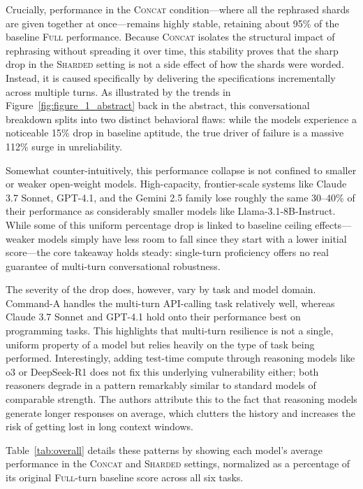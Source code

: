 \documentclass[manuscript,review]{acmart}
\begin{document}
Crucially, performance in the \textsc{Concat} condition—where all the rephrased shards are given together at once—remains highly stable, retaining about 95\% of the baseline \textsc{Full} performance. Because \textsc{Concat} isolates the structural impact of rephrasing without spreading it over time, this stability proves that the sharp drop in the \textsc{Sharded} setting is not a side effect of how the shards were worded. Instead, it is caused specifically by delivering the specifications incrementally across multiple turns. As illustrated by the trends in Figure~\ref{fig:figure_1_abstract} back in the abstract, this conversational breakdown splits into two distinct behavioral flaws: while the models experience a noticeable 15\% drop in baseline aptitude, the true driver of failure is a massive 112\% surge in unreliability.
 
Somewhat counter-intuitively, this performance collapse is not confined to smaller or weaker open-weight models. High-capacity, frontier-scale systems like Claude 3.7 Sonnet, GPT-4.1, and the Gemini 2.5 family lose roughly the same 30--40\% of their performance as considerably smaller models like Llama-3.1-8B-Instruct. While some of this uniform percentage drop is linked to baseline ceiling effects—weaker models simply have less room to fall since they start with a lower initial score—the core takeaway holds steady: single-turn proficiency offers no real guarantee of multi-turn conversational robustness. 

The severity of the drop does, however, vary by task and model domain. Command-A handles the multi-turn API-calling task relatively well, whereas Claude 3.7 Sonnet and GPT-4.1 hold onto their performance best on programming tasks. This highlights that multi-turn resilience is not a single, uniform property of a model but relies heavily on the type of task being performed. Interestingly, adding test-time compute through reasoning models like o3 or DeepSeek-R1 does not fix this underlying vulnerability either; both reasoners degrade in a pattern remarkably similar to standard models of comparable strength. The authors attribute this to the fact that reasoning models generate longer responses on average, which clutters the history and increases the risk of getting lost in long context windows.
 
Table~\ref{tab:overall} details these patterns by showing each model's average performance in the \textsc{Concat} and \textsc{Sharded} settings, normalized as a percentage of its original \textsc{Full}-turn baseline score across all six tasks.
 
\end{document}
